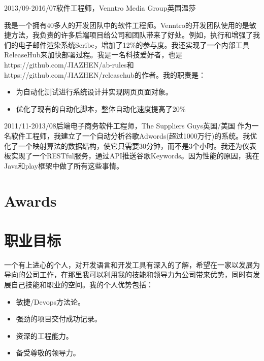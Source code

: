 \documentclass[a4paper]{twentysecondcv-cn} %
\begin{document}
\begin{twenty}
    \twentyitem
	    {2013/09-2016/07}{软件工程师，Venntro Media Group}{英国温莎}
    	{我是一个拥有40多人的开发团队中的软件工程师。Venntro的开发团队使用的是敏捷方法，我负责的许多后端项目给公司和团队带来了好处。例如，执行和增强了我们的电子邮件渲染系统Scribe，增加了12\%的参与度。我还实现了一个内部工具ReleaseHub来加快部署过程。我是一名科技爱好者，也是https://github.com/JIAZHEN/ab-rules和https://github.com/JIAZHEN/releasehub的作者。我的职责是：
        	\begin{itemize}
              \item 为自动化测试进行系统设计并实现网页页面对象。
              \item 优化了现有的自动化脚本，整体自动化速度提高了20\%
            \end{itemize}}
    \twentyitem
	    {2011/11-2013/08}{后端电子商务软件工程师，The Suppliers Guys}{英国/美国}
    	{作为一名软件工程师，我建立了一个自动分析谷歌Adwords(超过1000万行)的系统。我优化了一个映射算法的数据结构，使它只需要30分钟，而不是3个小时。我还为仪表板实现了一个RESTful服务，通过API推送谷歌Keywords。因为性能的原因，我在Java和play框架中做了所有这些事情。}
\end{twenty}

\section{Awards}

\begin{twentyshort} %
\end{twentyshort}

\newpage %

\makesidebar

\section{职业目标}

一个有上进心的个人，对开发语言和开发工具有深入的了解，希望在一家以发展为导向的公司工作，在那里我可以利用我的技能和领导力为公司带来优势，同时有发展自己技能和职业的空间。我的个人优势包括：
\begin{itemize}
  \item 敏捷/Devops方法论。
  \item 强劲的项目交付成功记录。
  \item 资深的工程能力。
  \item 备受尊敬的领导力。
\end{itemize}
\end{document}
